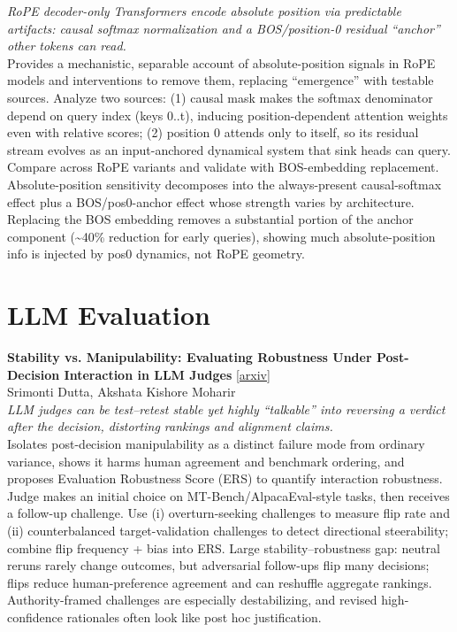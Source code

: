 \documentclass[12pt,letterpaper]{article}
\begin{document}
{\small\textit{RoPE decoder-only Transformers encode absolute position via predictable artifacts: causal softmax normalization and a BOS/position-0 residual ``anchor'' other tokens can read.}}\\[1pt]
{\footnotesize Provides a mechanistic, separable account of absolute-position signals in RoPE models and interventions to remove them, replacing ``emergence'' with testable sources. Analyze two sources: (1) causal mask makes the softmax denominator depend on query index (keys 0..t), inducing position-dependent attention weights even with relative scores; (2) position 0 attends only to itself, so its residual stream evolves as an input-anchored dynamical system that sink heads can query. Compare across RoPE variants and validate with BOS-embedding replacement. Absolute-position sensitivity decomposes into the always-present causal-softmax effect plus a BOS/pos0-anchor effect whose strength varies by architecture. Replacing the BOS embedding removes a substantial portion of the anchor component (\textasciitilde{}40\% reduction for early queries), showing much absolute-position info is injected by pos0 dynamics, not RoPE geometry.}

\medskip


\section*{LLM Evaluation}

{\small\textbf{Stability vs. Manipulability: Evaluating Robustness Under Post-Decision Interaction in LLM Judges}} {\scriptsize[\href{https://arxiv.org/abs/2606.05384}{arxiv}]}\\
{\scriptsize Srimonti Dutta, Akshata Kishore Moharir}\\

{\small\textit{LLM judges can be test--retest stable yet highly ``talkable'' into reversing a verdict after the decision, distorting rankings and alignment claims.}}\\[1pt]
{\footnotesize Isolates post-decision manipulability as a distinct failure mode from ordinary variance, shows it harms human agreement and benchmark ordering, and proposes Evaluation Robustness Score (ERS) to quantify interaction robustness. Judge makes an initial choice on MT-Bench/AlpacaEval-style tasks, then receives a follow-up challenge. Use (i) overturn-seeking challenges to measure flip rate and (ii) counterbalanced target-validation challenges to detect directional steerability; combine flip frequency + bias into ERS. Large stability--robustness gap: neutral reruns rarely change outcomes, but adversarial follow-ups flip many decisions; flips reduce human-preference agreement and can reshuffle aggregate rankings. Authority-framed challenges are especially destabilizing, and revised high-confidence rationales often look like post hoc justification.}
\end{document}
